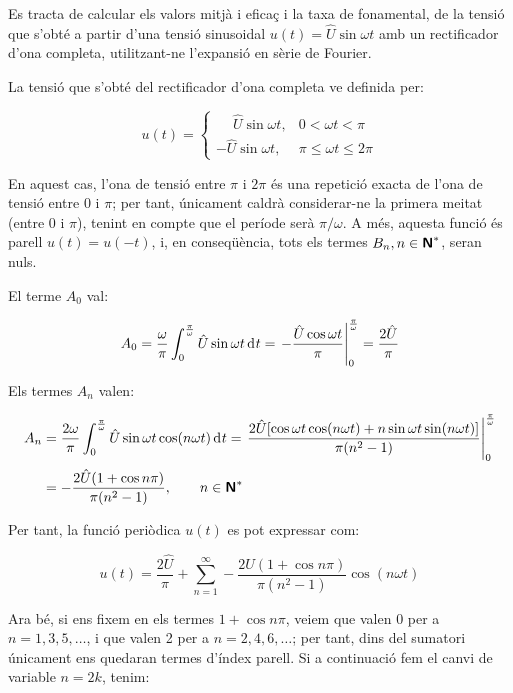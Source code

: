 	
\begin{exemple}[\ValorMitjaEfTaxaFon{}]
	\addcontentsxms{\ValorMitjaEfTaxaFon}
    Es tracta de calcular els valors mitjà i eficaç i la taxa de
    fonamental, de la tensió que s'obté a partir d'una tensió
    sinusoidal $u(t) = \hat{U} \sin\omega t$ amb un rectificador d'ona
    completa, utilitzant-ne l'expansió en sèrie de Fourier.

    La tensió que s'obté del rectificador d'ona completa ve definida
    per:

    \[
    u(t) = \begin{cases} \phantom{-}\hat{U} \sin\omega t, & 0 < \omega t < \pi\\
           -\hat{U} \sin\omega t, & \pi \leq \omega t \leq 2\pi \end{cases}
    \]

    En aquest cas, l'ona de tensió entre $\pi$ i $2\pi$ és una repetició
    exacta de l'ona de tensió entre 0 i $\pi$; per tant, únicament
    caldrà considerar-ne la primera meitat (entre 0 i $\pi$), tenint en
    compte que el període serà $\pi/\omega$. A més, aquesta funció és
    parell $u(t) = u(-t)$, i, en conseqüència, tots els termes
    $B_n, n \in {\ensuremath{\boldsymbol{\mathsf{N}}}}^*$, seran nuls.

    El terme $A_0$ val:

    \[
    A_0 = \frac{\omega}{\pi} \int_0^{\frac{\pi}{\omega}} \hat{U} \sin
    \omega t \diff t = \left. -\frac{\hat{U} \cos \omega t}{\pi}
    \right|_0^{\frac{\pi}{\omega}} = \frac{2\hat{U}}{\pi}
    \]

    Els termes $A_n$ valen:

    \[
    \begin{split}
    A_n &= \frac{2 \omega}{\pi} \int_0^{\frac{\pi}{\omega}} \hat{U} \sin
    \omega t \cos(n \omega t)\diff t = \left. \frac{2 \hat{U}[ \cos
    \omega t \cos (n \omega t) + n \sin \omega t \sin(n \omega
    t)]}{\pi(n^2-1)} \right|_0^{\frac{\pi}{\omega}}\\[0.5ex]
    &= -\frac{2\hat{U}(1+\cos n \pi)}{\pi(n^2-1)},
    \qquad n \in \mathsfb{N}^*
    \end{split}
    \]

    Per tant, la funció periòdica $u(t)$ es pot expressar com:

    \[
        u(t) = \frac{2\hat{U}}{\pi} + \sum_{n=1}^\infty
         - \frac{2\hat{U}(1+\cos n \pi)}{\pi(n^2-1)} \cos(n \omega t)
    \]

    Ara bé, si ens fixem en els termes $1+\cos n \pi$, veiem que valen 0
    per a $n=1,3,5,\ldots$, i que valen 2 per a $n=2,4,6,\ldots$; per tant, dins
    del sumatori únicament ens quedaran termes d'índex parell. Si a
    continuació fem el canvi de variable $n=2k$, tenim:


\end{exemple}
